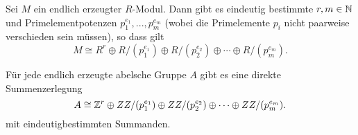\documentclass{book}
\begin{document}
\begin{cor}
    \label{cor:hirmodul}
    Sei $M$ ein endlich erzeugter $R$-Modul. Dann gibt es eindeutig
    bestimmte $r,m \in \mathbb{N}$ und Primelementpotenzen $p_1^{e_1}, ..., p_m^{e_m}$
    (wobei die Primelemente $p_i$ nicht paarweise verschieden sein müssen), so
    dass gilt 
    \[
        M \cong R^r \oplus R/(p_1^{e_1}) \oplus R/(p_2^{e_2}) \oplus \cdots \oplus R/(p_m^{e_m}).
    \]
\end{cor}

\begin{exa}
    \label{exa:klass}
    Für jede endlich erzeugte abelsche Gruppe $A$ gibt es eine direkte Summenzerlegung
    \[
        A \cong \mathbb{Z}^r \oplus ZZ/(p_1^{e_1}) \oplus ZZ/(p_2^{e_2}) \oplus \cdots \oplus ZZ/(p_m^{e_m}).
    \]
    mit eindeutigbestimmten Summanden.
\end{exa}
\end{document}
